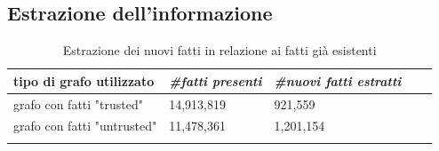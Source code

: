 \documentclass[10pt,a4paper,twocolumn]{article}
\begin{document}
\subsection{Estrazione dell'informazione}

\begin{table}[t]
	\centering
	\label{nuovi-vecchi}
	\begin{tabular}{lllll}
		tipo di grafo utilizzato    & \textit{\#fatti presenti} & \textit{\#nuovi fatti estratti} &  &  \\
		\hline
		grafo con fatti "trusted"   & 14,913,819                & 921,559                         &  &  \\
		grafo con fatti "untrusted" & 11,478,361                & 1,201,154                       &  &  \\
		&                           &                                 &  & 
	\end{tabular}
		\caption{Estrazione dei nuovi fatti in relazione ai fatti già esistenti}
\end{table}
\end{document}
